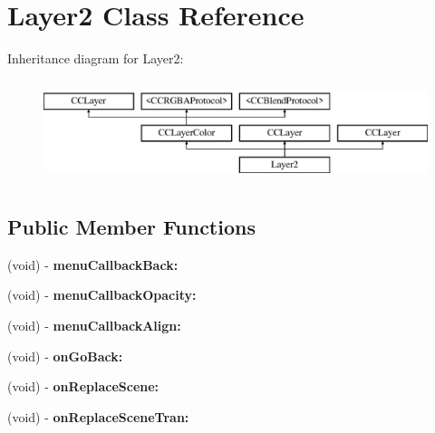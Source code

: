 \hypertarget{interface_layer2}{\section{Layer2 Class Reference}
\label{interface_layer2}
}
Inheritance diagram for Layer2\-:\begin{figure}[H]
\begin{center}
\leavevmode
\includegraphics[height=3.000000cm]{interface_layer2}
\end{center}
\end{figure}
\subsection*{Public Member Functions}
\begin{DoxyCompactItemize}
\item 
\hypertarget{interface_layer2_a78d61be8a397766e6250df870c68a348}{(void) -\/ {\bfseries menu\-Callback\-Back\-:}}\label{interface_layer2_a78d61be8a397766e6250df870c68a348}

\item 
\hypertarget{interface_layer2_aae9a0fe018d67e954eb78b7b2229f305}{(void) -\/ {\bfseries menu\-Callback\-Opacity\-:}}\label{interface_layer2_aae9a0fe018d67e954eb78b7b2229f305}

\item 
\hypertarget{interface_layer2_abc7b9c21fa046c480788e85070abc324}{(void) -\/ {\bfseries menu\-Callback\-Align\-:}}\label{interface_layer2_abc7b9c21fa046c480788e85070abc324}

\item 
\hypertarget{interface_layer2_a12028968abba60ff5fe3bc36c6a721e0}{(void) -\/ {\bfseries on\-Go\-Back\-:}}\label{interface_layer2_a12028968abba60ff5fe3bc36c6a721e0}

\item 
\hypertarget{interface_layer2_ab06886b87d20dc79a19e4a17c02c4515}{(void) -\/ {\bfseries on\-Replace\-Scene\-:}}\label{interface_layer2_ab06886b87d20dc79a19e4a17c02c4515}

\item 
\hypertarget{interface_layer2_a9b9c2bf207f1c59ed58105ec850a8e90}{(void) -\/ {\bfseries on\-Replace\-Scene\-Tran\-:}}\label{interface_layer2_a9b9c2bf207f1c59ed58105ec850a8e90}

\end{DoxyCompactItemize}
